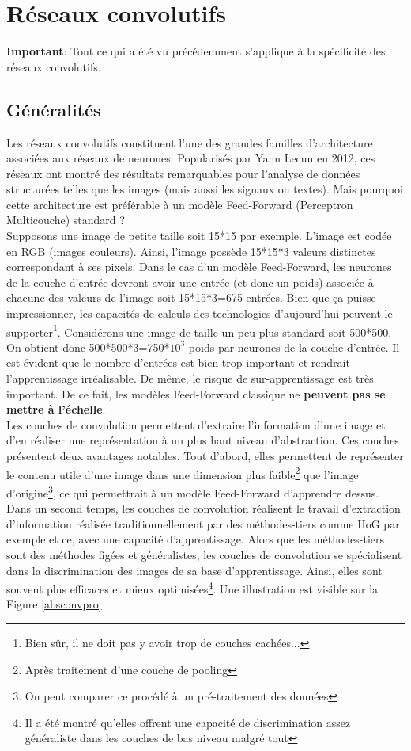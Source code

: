 \section{Réseaux convolutifs}
\label{convsecmain}
\textbf{Important}: Tout ce qui a été vu précédemment s'applique à la spécificité des réseaux convolutifs.
\subsection{Généralités}
Les réseaux convolutifs constituent l'une des grandes familles d'architecture associées aux réseaux de neurones. Popularisés par Yann Lecun en 2012, ces réseaux ont montré des résultats remarquables pour l'analyse de données structurées telles que les images (mais aussi les signaux ou textes). Mais pourquoi cette architecture est préférable à un modèle Feed-Forward (Perceptron Multicouche) standard ?\\

\noindent Supposons une image de petite taille soit 15*15 par exemple. L'image est codée en RGB (images couleurs). Ainsi, l'image possède 15*15*3 valeurs distinctes correspondant à ses pixels. Dans le cas d'un modèle Feed-Forward, les neurones de la couche d'entrée devront avoir une entrée (et donc un poids) associée à chacune des valeurs de l'image soit 15*15*3=675 entrées. Bien que ça puisse impressionner, les capacités de calculs des technologies d'aujourd'hui peuvent le supporter\footnote{Bien sûr, il ne doit pas y avoir trop de couches cachées...}. Considérons une image de taille un peu plus standard soit 500*500. On obtient donc 500*500*3=750*$10^3$ poids par neurones de la couche d'entrée. Il est évident que le nombre d'entrées est bien trop important et rendrait l'apprentissage irréalisable. De même, le risque de sur-apprentissage est très important. De ce fait, les modèles Feed-Forward classique ne \textbf{peuvent pas se mettre à l'échelle}.\\

\noindent Les couches de convolution permettent d'extraire l'information d'une image et d'en réaliser une représentation à un plus haut niveau d'abstraction. Ces couches présentent deux avantages notables. Tout d'abord, elles permettent de représenter le contenu utile d'une image dans une dimension plus faible\footnote{Après traitement d'une couche de pooling} que l'image d'origine\footnote{On peut comparer ce procédé à un pré-traitement des données}, ce qui permettrait à un modèle Feed-Forward d'apprendre dessus. Dans un second temps, les couches de convolution réalisent le travail d'extraction d'information réalisée traditionnellement par des méthodes-tiers comme HoG par exemple et ce, avec une capacité d'apprentissage. Alors que les méthodes-tiers sont des méthodes figées et généralistes, les couches de convolution se spécialisent dans la discrimination des images de sa base d'apprentissage. Ainsi, elles sont souvent plus efficaces et mieux optimisées\footnote{Il a été montré qu'elles offrent une capacité de discrimination assez généraliste dans les couches de bas niveau malgré tout}. Une illustration est visible sur la Figure \ref{absconvpro}\\

